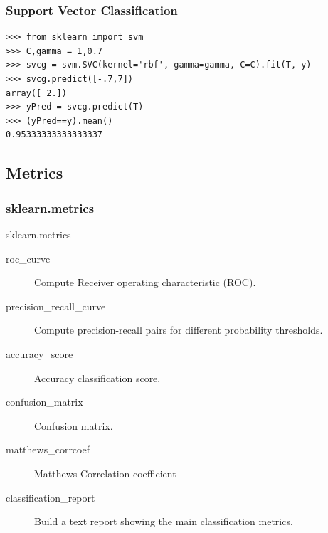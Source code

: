 \documentclass[10pt, colorlinks]{beamer}
\begin{document}
\begin{frame}[fragile]\frametitle{Support Vector Classification}
\begin{verbatim}
>>> from sklearn import svm
>>> C,gamma = 1,0.7
>>> svcg = svm.SVC(kernel='rbf', gamma=gamma, C=C).fit(T, y)
>>> svcg.predict([-.7,7])
array([ 2.])
>>> yPred = svcg.predict(T)
>>> (yPred==y).mean()
0.95333333333333337
\end{verbatim}

\end{frame}

\subsection{Metrics} %
\label{ssub:Metrics}
\begin{frame}[fragile]\frametitle{sklearn.metrics}
\begin{block}{sklearn.metrics}
\begin{description}
    \item[roc\_curve]  Compute Receiver operating characteristic (ROC).
    \item[precision\_recall\_curve] Compute precision-recall pairs for different probability thresholds.
    \item[accuracy\_score] Accuracy classification score.
    \item[confusion\_matrix] Confusion matrix. 
    \item[matthews\_corrcoef] Matthews Correlation coefficient
    \item[classification\_report] Build a text report showing the main classification metrics.
 \end{description}
\end{block}

\end{frame}
\end{document}
